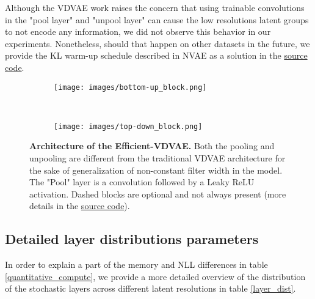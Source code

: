 \documentclass{article}
\begin{document}
Although the VDVAE work raises the concern that using trainable convolutions in the "pool layer" and "unpool layer" can cause the low resolutions latent groups to not encode any information, we did not observe this behavior in our experiments. Nonetheless, should that happen on other datasets in the future, we provide the KL warm-up schedule described in NVAE\cite{vahdat2020nvae} as a solution in the \href{https://github.com/Rayhane-mamah/Efficient-VDVAE}{source code}. 

\begin{figure*}[t!]
    \centering
    \begin{subfigure}[t]{0.5\textwidth}
        \centering
        \texttt{[image: images/bottom-up\_block.png]}
    \end{subfigure}~ 
    \begin{subfigure}[t]{0.5\textwidth}
        \centering
        \texttt{[image: images/top-down\_block.png]}
    \end{subfigure}
    \caption{\textbf{Architecture of the Efficient-VDVAE.} Both the pooling and unpooling are different from the traditional VDVAE architecture for the sake of generalization of non-constant filter width in the model. The "Pool" layer is a convolution followed by a Leaky ReLU activation. Dashed blocks are optional and not always present (more details in the \href{https://github.com/Rayhane-mamah/Efficient-VDVAE}{source code}).}
\label{architecture_fig}
\end{figure*}

\subsection{Detailed layer distributions parameters}
In order to explain a part of the memory and NLL differences in table \ref{quantitative_compute}, we provide a more detailed overview of the distribution of the stochastic layers across different latent resolutions in table \ref{layer_dist}.
\end{document}
